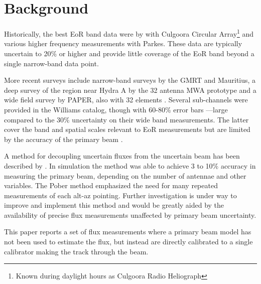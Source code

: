 \documentclass[preprint]{aastex}
\begin{document}

\section{Background}


Historically, the best
EoR band data were by \citet{Slee:1995p7541} with Culgoora Circular
Array\footnote{Known during daylight hours as Culgoora Radio Heliograph} and
various higher frequency measurements with Parkes.  These data are typically
uncertain to 20\% or higher and provide little coverage of the EoR band beyond
a single narrow-band data point. 

More recent surveys include narrow-band surveys by the GMRT and Mauritius, a
deep survey of the region near Hydra A by the 32 antenna MWA prototype
\cite{Williams:2012p8768} and a wide field survey by PAPER, also with 32
elements \cite{Jacobs:2011p8438}. Several sub-channels were provided in the
Williams catalog, though with 60-80\% error bars ---large compared to the 30\%
uncertainty on their wide band measurements.  The latter cover the band and
spatial scales relevant to EoR measurements but are limited by the accuracy of
the primary beam \citep{Jacobs:2013p9713}.

A method for decoupling uncertain fluxes from the uncertain beam has been
described by \citet{Pober:2012p8800}. In simulation the method was able to
achieve 3 to 10\% accuracy in measuring the primary beam, depending on the
number of antennae and other variables. The Pober method emphasized the need
for many repeated measurements of each alt-az pointing. Further investigation
is under way to improve and implement this method and would be greatly aided by
the availability of precise flux measurements unaffected by primary beam
uncertainty. 

This paper reports a set of flux measurements where a primary beam
model has not been used to estimate the flux, but instead are directly
calibrated to a single calibrator making the track through the beam.
\end{document}
